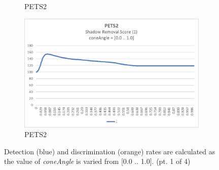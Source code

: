 \begin{appendices}
\begin{figure}
\begin{subfigure}{.45\linewidth}
  \caption{PETS2}
\end{subfigure}
\hfill
\begin{subfigure}{.45\linewidth}
  \includegraphics[width=1\linewidth]{figures/appendix/pets2_coneAngle_score.jpg}
  \caption{PETS2}
\end{subfigure}
\caption{Detection (blue) and discrimination (orange) rates are calculated as the value of \textit{coneAngle} is varied from [0.0 .. 1.0]. (pt. 1 of 4)}

\end{figure}

\begin{figure}


\end{figure}
\end{appendices}
